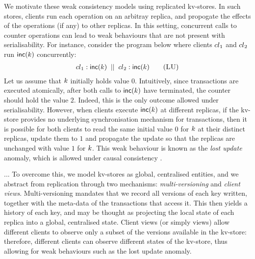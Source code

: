 We motivate these weak consistency models using replicated kv-stores. In
such stores, clients run each operation on an arbitray replica, and
propogate the effects of the operations (if any) to other
replicas. In this setting, concurrent calls to counter
operations can lead to weak behaviours that are not present with
serialisability.
%
%
For instance, consider the program below where  clients ${cl}_1$ and 
${cl}_2$  run $\mathsf{inc}(k)$ concurrently: 
\begin{align}
	\cl_1: \ctrinc(\ke)
	\;\; || \;\;
	\cl_2: \ctrinc(\ke)
	\tag{\textsc{LU}}
	\label{prog:inc2}
\end{align}
Let us assume that  $k$ initially holds value $0$.
Intuitively, since transactions are executed atomically, after both
calls to $\mathsf{inc}(k)$ have terminated, the counter should hold 
the value $2$.
Indeed, this is the only outcome allowed under serialisability. 
However, when clients execute $\mathsf{inc}(k)$ at different replicas,
if the kv-store provides no underlying synchronisation mechanism for transactions,
 then it is possible for 
both clients to  read the same initial value $0$ for $k$ at their
distinct replicas, update them to $1$ and propagate the update so that 
 the replicas are unchanged with value  $1$ for $k$.
This weak behaviour is known as the \emph{lost update} anomaly, which
is  allowed under causal consistency \cite{cops,wren,redblue}.


...
To overcome this, we model kv-stores as global, centralised entities, and 
we abstract from replication through two mechanisms: \emph{multi-versioning} and \emph{client views}. 
Multi-versioning mandates that we record all versions of each key written, 
together with the meta-data of the transactions that access it. 
This then yields a history of each key, and may be thought as projecting the local state of each replica into a global, centralised state. 
Client views (or simply views) allow different clients to observe only a subset of the versions available in 
the kv-store: 
therefore, different clients can observe different states 
of the kv-store, thus allowing for weak behaviours such as the lost update anomaly. 


